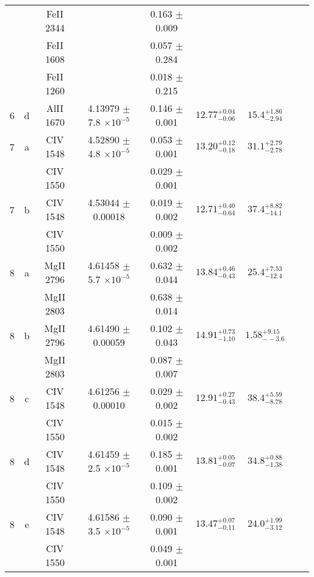 \documentclass[12pt]{article}
\begin{document}
\begin{footnotesize}
\begin{longtable}{ c c c c c c c c c}
  &   & FeII     2344  &  &  0.163 $\pm$ 0.009   &   &     & 	 & \\ 
  &   & FeII     1608  &  &  0.057 $\pm$ 0.284   &   &     & 	 & \\ 
  &   & FeII     1260  &  &  0.018 $\pm$ 0.215   &   &     & 	 & \\ 
       6  & d  & AlII     1670  &  4.13979 $\pm$ 7.8 $\times 10^{-5}$   &  0.146 $\pm$ 0.001   & $12.77_{ - 0.06}^{ + 0.04}$  & $15.4_{ - 2.94}^{ + 1.86}$    & 	 & \\ 
       7  & a  & CIV     1548  &  4.52890 $\pm$ 4.8 $\times 10^{-5}$   &  0.053 $\pm$ 0.001   & $13.20_{ - 0.18}^{ + 0.12}$  & $31.1_{ - 2.78}^{ + 2.79}$    & 	 & \\ 
  &   & CIV     1550  &  &  0.029 $\pm$ 0.001   &   &     & 	 & \\ 
       7  & b  & CIV     1548  &  4.53044 $\pm$ 0.00018  &  0.019 $\pm$ 0.002   & $12.71_{ - 0.64}^{ + 0.40}$  & $37.4_{ - 14.1}^{ + 8.82}$    & 	 & \\ 
  &   & CIV     1550  &  &  0.009 $\pm$ 0.002   &   &     & 	 & \\ 
       8  & a  & MgII     2796  &  4.61458 $\pm$ 5.7 $\times 10^{-5}$   &  0.632 $\pm$ 0.044   & $13.84_{ - 0.43}^{ + 0.46}$  & $25.4_{ - 12.4}^{ + 7.53}$    & 	 & \\ 
  &   & MgII     2803  &  &  0.638 $\pm$ 0.014   &   &     & 	 & \\ 
       8  & b  & MgII     2796  &  4.61490 $\pm$ 0.00059  &  0.102 $\pm$ 0.043   & $14.91_{ - 1.10}^{ + 0.73}$  & $1.58_{ - -3.6}^{ + 9.15}$    & 	 & \\ 
  &   & MgII     2803  &  &  0.087 $\pm$ 0.007   &   &     & 	 & \\ 
       8  & c  & CIV     1548  &  4.61256 $\pm$ 0.00010  &  0.029 $\pm$ 0.002   & $12.91_{ - 0.43}^{ + 0.27}$  & $38.4_{ - 8.78}^{ + 5.59}$    & 	 & \\ 
  &   & CIV     1550  &  &  0.015 $\pm$ 0.002   &   &     & 	 & \\ 
       8  & d  & CIV     1548  &  4.61459 $\pm$ 2.5 $\times 10^{-5}$   &  0.185 $\pm$ 0.001   & $13.81_{ - 0.07}^{ + 0.05}$  & $34.8_{ - 1.38}^{ + 0.88}$    & 	 & \\ 
  &   & CIV     1550  &  &  0.109 $\pm$ 0.002   &   &     & 	 & \\ 
       8  & e  & CIV     1548  &  4.61586 $\pm$ 3.5 $\times 10^{-5}$   &  0.090 $\pm$ 0.001   & $13.47_{ - 0.11}^{ + 0.07}$  & $24.0_{ - 3.12}^{ + 1.99}$    & 	 & \\ 
  &   & CIV     1550  &  &  0.049 $\pm$ 0.001   &   &     & 	 & \\ 

\end{longtable}
\end{footnotesize}
\end{document}
